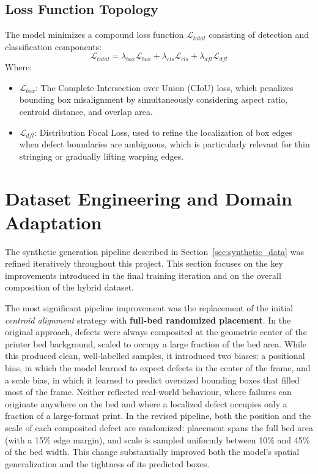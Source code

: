 \documentclass[english, Lau, oneside]{sapthesis}
\begin{document}
\subsection{Loss Function Topology}
The model minimizes a compound loss function $\mathcal{L}_{total}$ consisting of detection and classification components:
\begin{equation}
    \mathcal{L}_{total} = \lambda_{box}\mathcal{L}_{box} + \lambda_{cls}\mathcal{L}_{cls} + \lambda_{dfl}\mathcal{L}_{dfl}
\end{equation}
Where:
\begin{itemize}
    \item $\mathcal{L}_{box}$: The Complete Intersection over Union (CIoU) loss, which penalizes bounding box misalignment by simultaneously considering aspect ratio, centroid distance, and overlap area.
    \item $\mathcal{L}_{dfl}$: Distribution Focal Loss, used to refine the localization of box edges when defect boundaries are ambiguous, which is particularly relevant for thin stringing or gradually lifting warping edges.
\end{itemize}

\section{Dataset Engineering and Domain Adaptation}
\label{sec:dataset}

The synthetic generation pipeline described in Section~\ref{sec:synthetic_data} was refined iteratively throughout this project. This section focuses on the key improvements introduced in the final training iteration and on the overall composition of the hybrid dataset.

The most significant pipeline improvement was the replacement of the initial \textit{centroid alignment} strategy with \textbf{full-bed randomized placement}. In the original approach, defects were always composited at the geometric center of the printer bed background, scaled to occupy a large fraction of the bed area. While this produced clean, well-labelled samples, it introduced two biases: a positional bias, in which the model learned to expect defects in the center of the frame, and a scale bias, in which it learned to predict oversized bounding boxes that filled most of the frame. Neither reflected real-world behaviour, where failures can originate anywhere on the bed and where a localized defect occupies only a fraction of a large-format print. In the revised pipeline, both the position and the scale of each composited defect are randomized: placement spans the full bed area (with a 15\% edge margin), and scale is sampled uniformly between 10\% and 45\% of the bed width. This change substantially improved both the model's spatial generalization and the tightness of its predicted boxes.
\end{document}
